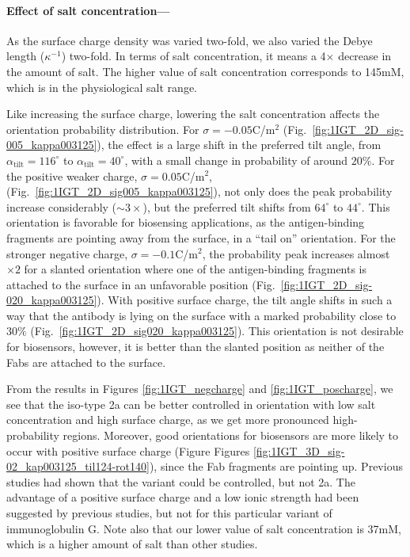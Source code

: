  \medskip
 
 \paragraph*{Effect of salt concentration---}
 
As the surface charge density was varied two-fold, we also varied the Debye length ($\kappa^{-1}$) two-fold. In terms of salt concentration, it means a 4$\times$ decrease in the amount of salt. The higher value of salt concentration corresponds to 145mM, which is in the physiological salt range.  
 
Like increasing the surface charge, lowering the salt concentration affects the orientation probability distribution. 
 For $\sigma=-0.05$C/m$^2$ (Fig.~\ref{fig:1IGT_2D_sig-005_kappa003125}), the effect is a large shift in the preferred tilt angle, from $\alpha_\text{tilt}=116^\circ$ to $\alpha_\text{tilt}=40^\circ$, with a small change in probability of around $20\%$. 
For the positive weaker charge, $\sigma=0.05$C/m$^2$, (Fig.~\ref{fig:1IGT_2D_sig005_kappa003125}), not only does the peak probability increase considerably ($\sim 3\times$), but the preferred tilt shifts from $64^{\circ}$ to $44^{\circ}$.
This orientation is favorable for biosensing applications, as the antigen-binding fragments are pointing away from the surface, in a ``tail on'' orientation.
 For the stronger negative charge, $\sigma=-0.1$C/m$^2$, the probability peak increases almost $\times 2$ for a slanted orientation where one of the antigen-binding fragments is attached to the surface in an unfavorable position (Fig.~\ref{fig:1IGT_2D_sig-020_kappa003125}).
 With positive surface charge, the tilt angle shifts in such a way that the antibody is lying on the surface with a marked probability close to $30\%$ (Fig.~\ref{fig:1IGT_2D_sig020_kappa003125}).
 This orientation is not desirable for biosensors, however, it is better than the slanted position as neither of the Fabs are attached to the surface.

From the results in Figures \ref{fig:1IGT_negcharge} and \ref{fig:1IGT_poscharge}, we see that the iso-type \ig 2a can be better controlled in orientation with low salt concentration and high surface charge, as we get more pronounced high-probability regions. 
Moreover, good orientations for biosensors are more likely to occur with positive surface charge (Figure Figures \ref{fig:1IGT_3D_sig-02_kap003125_til124-rot140}), since the Fab fragments are pointing up.
Previous studies had shown that the  variant could be controlled, but not \ig 2a. 
The advantage of a positive surface charge and a low ionic strength had been suggested by previous studies, but not for this particular variant of immunoglobulin G. Note also that our lower value of salt concentration is 37mM, which is a higher amount of salt than other studies.\cite{BuijsETal1997,ChenLiuZhouJiang2003}


